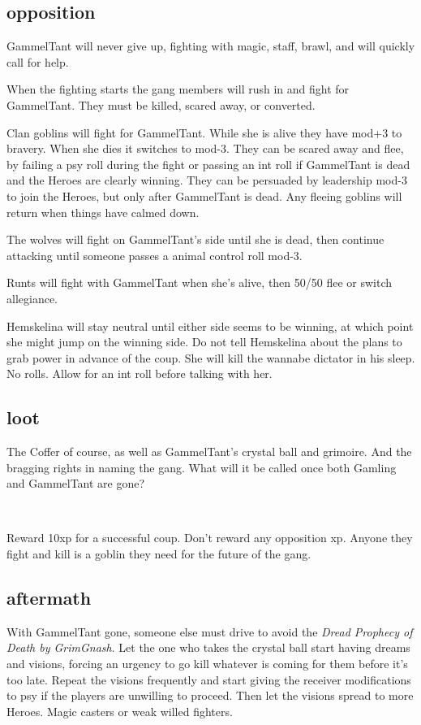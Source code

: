 \subsection*{opposition}

GammelTant will never give up, fighting with magic, staff, brawl, and will quickly call for help.

When the fighting starts the gang members will rush in and fight for GammelTant. They must be killed, scared away, or converted. 

Clan goblins will fight for GammelTant. While she is alive they have mod+3 to bravery. When she dies it switches to mod-3.
They can be scared away and flee, by failing a psy roll during the fight or passing an int roll if GammelTant is dead and the Heroes are clearly winning.
They can be persuaded by leadership mod-3 to join the Heroes, but only after GammelTant is dead.
Any fleeing goblins will return when things have calmed down.

The wolves will fight on GammelTant's side until she is dead, then continue attacking until someone passes a animal control roll mod-3.

Runts will fight with GammelTant when she's alive, then 50/50 flee or switch allegiance. 

Hemskelina will stay neutral until either side seems to be winning, at which point she might jump on the winning side. Do not tell Hemskelina about the plans to grab power in advance of the coup. She will kill the wannabe dictator in his sleep. No rolls. Allow for an int roll before talking with her.


\subsection*{loot}

The Coffer of course, as well as GammelTant's crystal ball and grimoire. And the bragging rights in naming the gang. What will it be called once both Gamling and GammelTant are gone?

\

Reward 10xp for a successful coup. Don't reward any opposition xp. Anyone they fight and kill is a goblin they need for the future of the gang.


\subsection*{aftermath}
\label{coupaftermath}

With GammelTant gone, someone else must drive to avoid the \emph{Dread Prophecy of Death by GrimGnash}. Let the one who takes the crystal ball start having dreams and visions, forcing an urgency to go kill whatever is coming for them before it's too late. Repeat the visions frequently and start giving the receiver modifications to psy if the players are unwilling to proceed. Then let the visions spread to more Heroes. Magic casters or weak willed fighters.

